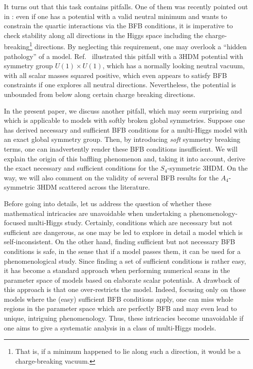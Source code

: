 \documentclass[11pt]{article}
\begin{document}
It turns out that this task contains pitfalls. One of them was recently pointed out in \cite{Faro:2019vcd}:
even if one has a potential with a valid neutral minimum and wants to constrain the quartic interactions via the BFB conditions, 
it is imperative to check stability along all directions in the Higgs space including the charge-breaking\footnote{That is, 
if a minimum happened to lie along such a direction, it would be a charge-breaking vacuum.} directions.
By neglecting this requirement, one may overlook a ``hidden pathology'' of a model.
Ref.~\cite{Faro:2019vcd} illustrated this pitfall with a 3HDM potential with symmetry group $U(1)\times U(1)$,
which has a normally looking neutral vacuum, with all scalar masses squared positive, 
which even appears to satisfy BFB constraints if one explores all neutral directions.
Nevertheless, the potential is unbounded from below along certain charge breaking directions.

In the present paper, we discuss another pitfall, which may seem surprising and which is applicable 
to models with softly broken global symmetries.
Suppose one has derived necessary and sufficient BFB conditions for a multi-Higgs model with an exact global symmetry group.
Then, by introducing {\em soft} symmetry breaking terms, one can inadvertently render these BFB conditions insufficient.
We will explain the origin of this baffling phenomenon and, taking it into account, derive the exact necessary and sufficient conditions
for the $S_4$-symmetric 3HDM. 
On the way, we will also comment on the validity of several BFB results for the $A_4$-symmetric 3HDM scattered across the literature.

Before going into details, let us address the question of whether these mathematical intricacies are unavoidable 
when undertaking a phenomenology-focused multi-Higgs study.
Certainly, conditions which are necessary but not sufficient are dangerous, as one may be led to explore in detail
a model which is self-inconsistent. On the other hand, finding sufficient but not necessary BFB conditions is safe,
in the sense that if a model passes them, it can be used for a phenomenological study.
Since finding a set of sufficient conditions is rather easy, it has become a standard approach 
when performing numerical scans in the parameter space of models based on elaborate scalar potentials.
A drawback of this approach is that one over-restricts the model.
Indeed, focusing only on those models where the (easy) sufficient BFB conditions apply, 
one can miss whole regions in the parameter space which are perfectly BFB and may even lead 
to unique, intriguing phenomenology.
Thus, these intricacies become unavoidable if one aims to give a systematic analysis in a class of multi-Higgs models.
\end{document}
